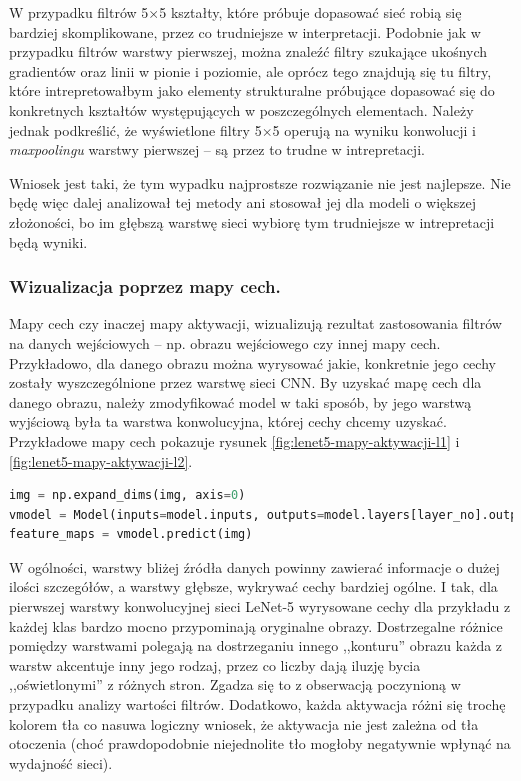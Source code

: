 W przypadku filtrów 5\(\times\)5 kształty, które próbuje dopasować sieć robią się bardziej skomplikowane, przez co trudniejsze w interpretacji. Podobnie jak w przypadku filtrów warstwy pierwszej, można znaleźć filtry szukające ukośnych gradientów oraz linii w pionie i poziomie, ale oprócz tego znajdują się tu filtry, które intrepretowałbym jako elementy strukturalne próbujące dopasować się do konkretnych kształtów występujących w poszczególnych elementach. Należy jednak podkreślić, że
wyświetlone filtry 5\(\times\)5 operują na wyniku konwolucji i \textit{maxpoolingu} warstwy pierwszej -- są przez to trudne w intrepretacji.

Wniosek jest taki, że tym wypadku najprostsze rozwiązanie nie jest najlepsze. Nie będę więc dalej analizował tej metody ani stosował jej dla modeli o większej złożoności, bo im głębszą warstwę sieci wybiorę tym trudniejsze w intrepretacji będą wyniki.

\subsubsection{Wizualizacja poprzez mapy cech.}
Mapy cech czy inaczej mapy aktywacji, wizualizują rezultat zastosowania filtrów na danych wejściowych -- np. obrazu wejściowego czy innej mapy cech. Przykładowo, dla danego obrazu można wyrysować jakie, konkretnie jego cechy zostały wyszczególnione przez warstwę sieci CNN. 
By uzyskać mapę cech dla danego obrazu, należy zmodyfikować model w taki sposób, by jego warstwą wyjściową była ta warstwa konwolucyjna, której cechy chcemy uzyskać. Przykładowe mapy cech pokazuje rysunek \ref{fig:lenet5-mapy-aktywacji-l1} i \ref{fig:lenet5-mapy-aktywacji-l2}.

\label{lst:lenet5keras-mapy}
\begin{lstlisting}[language=Python, caption={Uzyskiwanie mapy aktywacji dla danego modelu i obrazu w Keras.}, captionpos=b]
img = np.expand_dims(img, axis=0)
vmodel = Model(inputs=model.inputs, outputs=model.layers[layer_no].output)
feature_maps = vmodel.predict(img)
\end{lstlisting}

W ogólności, warstwy bliżej źródła danych powinny zawierać informacje o dużej ilości szczegółów, a warstwy głębsze, wykrywać cechy bardziej ogólne. I tak, 
dla pierwszej warstwy konwolucyjnej sieci LeNet-5 wyrysowane cechy dla przykładu z każdej klas bardzo mocno przypominają oryginalne obrazy. Dostrzegalne różnice pomiędzy warstwami polegają na dostrzeganiu innego ,,konturu'' obrazu każda z warstw akcentuje inny jego rodzaj, przez co liczby dają iluzję bycia ,,oświetlonymi'' z różnych stron.
Zgadza się to z obserwacją poczynioną w przypadku analizy wartości filtrów. Dodatkowo, każda aktywacja różni się trochę kolorem tła co nasuwa logiczny wniosek, że aktywacja nie jest zależna od tła otoczenia (choć prawdopodobnie niejednolite tło mogłoby negatywnie wpłynąć na wydajność sieci).

